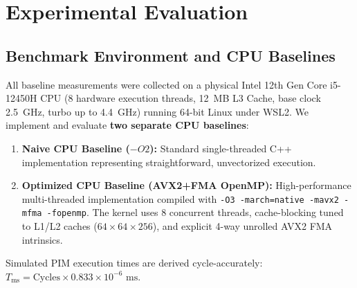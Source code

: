 \documentclass[conference]{IEEEtran}
\begin{document}
\section{Experimental Evaluation}
\label{sec:evaluation}

\subsection{Benchmark Environment and CPU Baselines}
All baseline measurements were collected on a physical Intel 12th Gen Core i5-12450H CPU (8 hardware execution threads, 12~MB L3 Cache, base clock 2.5~GHz, turbo up to 4.4~GHz) running 64-bit Linux under WSL2. We implement and evaluate \textbf{two separate CPU baselines}:
\begin{enumerate}
    \item \textbf{Naive CPU Baseline ($-O2$):} Standard single-threaded C++ implementation representing straightforward, unvectorized execution.
    \item \textbf{Optimized CPU Baseline (AVX2+FMA OpenMP):} High-performance multi-threaded implementation compiled with \texttt{-O3 -march=native -mavx2 -mfma -fopenmp}. The kernel uses 8 concurrent threads, cache-blocking tuned to L1/L2 caches ($64 \times 64 \times 256$), and explicit 4-way unrolled AVX2 FMA intrinsics.
\end{enumerate}

Simulated PIM execution times are derived cycle-accurately: $T_{\text{ms}} = \text{Cycles} \times 0.833 \times 10^{-6}\text{ ms}$.
\end{document}
